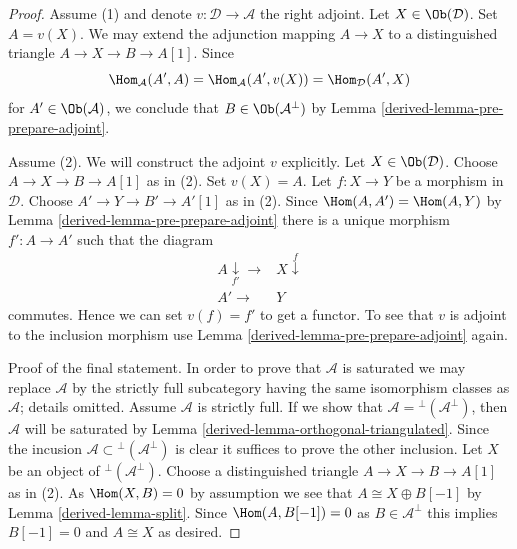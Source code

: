 \begin{proof}

Assume (1) and denote $v : \mathcal{D} \to \mathcal{A}$ the right adjoint.
Let $X \in \Ob(\mathcal{D})$. Set $A = v(X)$. We may extend the
adjunction mapping $A \to X$ to a distinguished triangle
$A \to X \to B \to A[1]$. Since
$$
\Hom_\mathcal{A}(A', A) =
\Hom_\mathcal{A}(A', v(X)) =
\Hom_\mathcal{D}(A', X)
$$
for $A' \in \Ob(\mathcal{A})$, we conclude that $B \in \Ob(\mathcal{A}^\perp)$
by Lemma \ref{derived-lemma-pre-prepare-adjoint}.

\medskip\noindent
Assume (2). We will construct the adjoint $v$ explicitly.
Let $X \in \Ob(\mathcal{D})$. Choose $A \to X \to B \to A[1]$ as in (2).
Set $v(X) = A$. Let $f : X \to Y$ be a morphism in $\mathcal{D}$.
Choose $A' \to Y \to B' \to A'[1]$ as in (2). Since
$\Hom(A, A') = \Hom(A, Y)$ by Lemma \ref{derived-lemma-pre-prepare-adjoint}
there is a unique morphism $f' : A \to A'$ such that the diagram
$$
\begin{array}{cc}A \underset{f'}{\downarrow}\longrightarrow & X \overset{f}{\downarrow} \\ A' \longrightarrow & Y\end{array}
$$
commutes. Hence we can set $v(f) = f'$ to get a functor.
To see that $v$ is adjoint to the inclusion morphism use
Lemma \ref{derived-lemma-pre-prepare-adjoint} again.

\medskip\noindent
Proof of the final statement. In order to prove that $\mathcal{A}$
is saturated we may replace $\mathcal{A}$ by the strictly full
subcategory having the same isomorphism classes as $\mathcal{A}$;
details omitted. Assume $\mathcal{A}$ is strictly full. If we show that
$\mathcal{A} = {}^\perp(\mathcal{A}^\perp)$, then
$\mathcal{A}$ will be saturated by Lemma \ref{derived-lemma-orthogonal-triangulated}.
Since the incusion $\mathcal{A} \subset {}^\perp(\mathcal{A}^\perp)$
is clear it suffices to prove the other inclusion.
Let $X$ be an object of ${}^\perp(\mathcal{A}^\perp)$.
Choose a distinguished triangle $A \to X \to B \to A[1]$
as in (2). As $\Hom(X, B) = 0$ by assumption we see that
$A \cong X \oplus B[-1]$ by Lemma \ref{derived-lemma-split}.
Since $\Hom(A, B[-1]) = 0$ as $B \in \mathcal{A}^\perp$
this implies $B[-1] = 0$ and $A \cong X$ as desired.
\end{proof}

